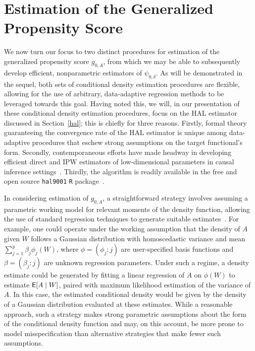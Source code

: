 \section{Estimation of the Generalized Propensity Score}\label{methods}

We now turn our focus to two distinct procedures for estimation of the
generalized propensity score $g_{0,A}$, from which we may be able to
subsequently develop efficient, nonparametric estimators of $\psi_{0,\delta}$.
As will be demonstrated in the sequel, both sets of conditional density
estimation procedures are flexible, allowing for the use of arbitrary,
data-adaptive regression methods to be leveraged towards this goal. Having noted
this, we will, in our presentation of these conditional density estimation
procedures, focus on the HAL estimator discussed in Section~\ref{hal}; this is
chiefly for three reasons. Firstly, formal theory guaranteeing the convergence
rate of the HAL estimator is unique among data-adaptive procedures that eschew
strong assumptions on the target functional's form. Secondly, contemporaneous
efforts have made headway in developing efficient direct and IPW estimators of
low-dimensional parameters in causal inference
settings~\citep{vdl2019efficient,ertefaie2020nonparametric}. Thirdly, the
algorithm is readily available in the free and open source \texttt{hal9001}
\texttt{R} package~\citep{coyle2020hal9001-rpkg, hejazi2020hal9001-joss}.

In considering estimation of $g_{0,A}$, a straightforward strategy involves
assuming a parametric working model for relevant moments of the density
function, allowing the use of standard regression techniques to generate
suitable estimates~\citep{robins2000marginal,
hirano2004propensity,imai2004causal}. For example, one could operate under the
working assumption that the density of $A$ given $W$ follows a Gaussian
distribution with homoscedastic variance and mean $\sum_{j=1}^p \beta_j
\phi_j(W)$, where $\phi = (\phi_j : j)$ are user-specified basis functions and
$\beta = (\beta_j : j)$ are unknown regression parameters. Under such a regime,
a density estimate could be generated by fitting a linear regression of $A$ on
$\phi(W)$ to estimate $\mathsf{E}[A \mid W]$, paired with maximum likelihood estimation
of the variance of $A$. In this case, the estimated conditional density would be
given by the density of a Gaussian distribution evaluated at these estimates.
While a reasonable approach, such a strategy makes strong parametric assumptions
about the form of the conditional density function and may, on this account, be
more prone to model misspecification than alternative strategies that make fewer
such assumptions.

